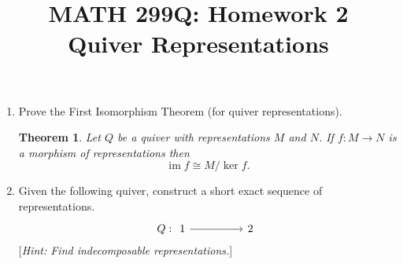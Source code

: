 \documentclass{article}
\title{MATH 299Q: Homework 2\\{\Large Quiver Representations}}
\author{}
\date{}
\theoremstyle{plain}
\newtheorem*{thm*}{Theorem}
\theoremstyle{definition}
\theoremstyle{remark}
\numberwithin{equation}{section}
\def\k{k}
\DeclareMathOperator{\im}{im}
\begin{document}
\maketitle


\begin{enumerate}[1.]
    \item Prove the First Isomorphism Theorem (for quiver representations).
    \begin{thm*}
        Let $Q$ be a quiver with representations $M$ and $N$. If $f:M\to N$ is a morphism of representations then
        \[\im f\cong M/\ker f.\]
    \end{thm*}
    \vfill
    \item Given the following quiver, construct a short exact sequence of representations.
    \[Q:\begin{tikzcd}1\arrow[rr]&&2\end{tikzcd}\]
    [\textit{Hint: Find indecomposable representations.}]
    \vfill
\end{enumerate}
\end{document}
